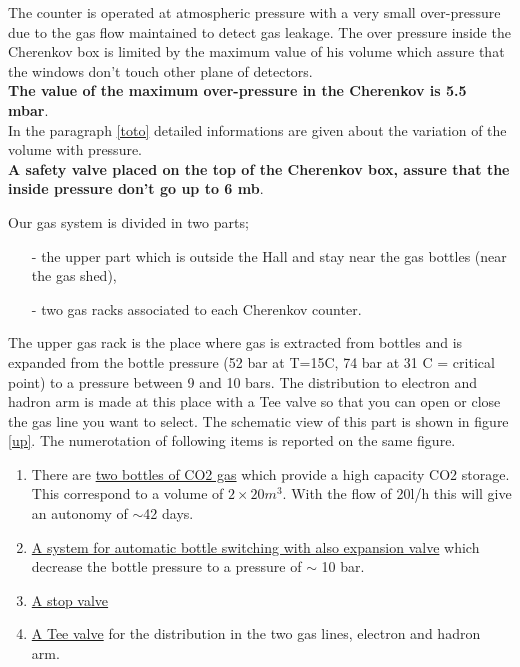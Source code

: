 \documentclass[12pt]{article}
\begin{document}

The counter is operated at atmospheric pressure with a very small
over-pressure due to the gas flow maintained to detect gas leakage. 
The over pressure inside the Cherenkov box is limited by the maximum value
of his volume which assure that the windows don't touch other plane
of detectors.\\ 
{\bf The value of the maximum over-pressure in the Cherenkov is 5.5 mbar}.\\
In the paragraph \ref{toto} detailed informations are given about the
 variation of the volume with pressure.\\
{\bf A safety valve placed on the top of the
Cherenkov box, assure that the inside pressure don't go up to 6 mb}.

\label{upi}
Our gas system is divided in two parts; 
\begin{itemize}
\item[-] the upper part which is outside the Hall and stay near the gas 
bottles (near the gas shed),
\item[-] two gas racks associated to each Cherenkov counter.
\end{itemize}
The upper gas rack is the place where gas is extracted from bottles and is
 expanded from the bottle pressure (52 bar at T=15C, 74 bar at 31 C 
= critical point) to a pressure between 9 and 10 bars. The distribution to 
electron and hadron arm is made at this place with a Tee valve so that you
can open or close the gas line you want to select. The schematic view of this
part is shown  in figure \ref{up}. The numerotation of following items is 
reported on the same figure.
\begin{enumerate}
\item There are \underline{two bottles of CO2 gas} 
which provide a high capacity CO2 storage. This correspond to a volume 
of $2\times 20m^3$. With the flow of 20l/h  this will give an autonomy 
of $\sim$42 days.
\item \underline{A system for automatic bottle switching with also expansion 
valve} which decrease the bottle pressure to a pressure of $\sim$ 10 bar.
\item \underline{A stop valve}
\item \underline{A Tee valve} for the distribution in the two gas lines, 
electron and hadron arm.
\end{enumerate}
\end{document}
